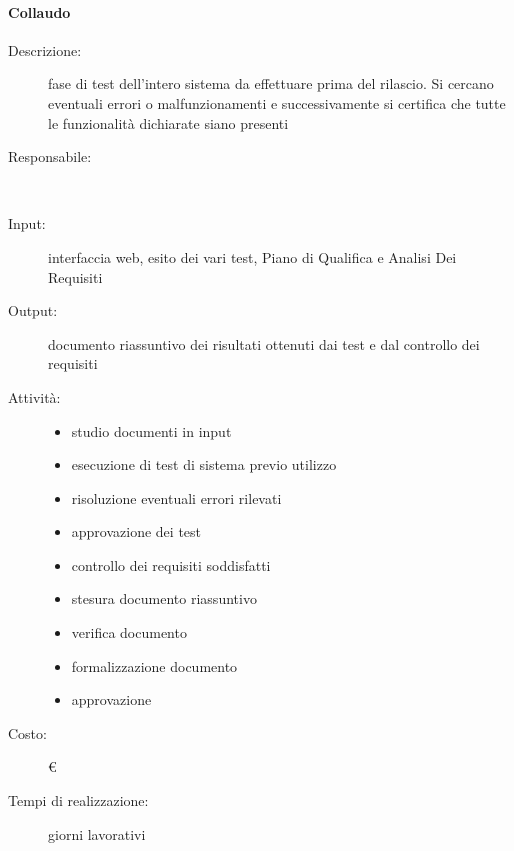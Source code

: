 \paragraph{Collaudo}
\begin{description}
\item[Descrizione:] fase di test dell’intero sistema da effettuare prima del rilascio. Si cercano
eventuali errori o malfunzionamenti e successivamente si certifica che tutte le funzionalità dichiarate siano presenti \\

\item[Responsabile:] \\

\item[Input:] interfaccia web, esito dei vari test, Piano di Qualifica e Analisi Dei Requisiti \\

\item[Output:] documento riassuntivo dei risultati ottenuti dai test e dal controllo dei requisiti \\

\item[Attività:]
\begin{itemize}
\item studio documenti in input
\item esecuzione di test di sistema previo utilizzo
\item risoluzione eventuali errori rilevati
\item approvazione dei test
\item controllo dei requisiti soddisfatti
\item stesura documento riassuntivo
\item verifica documento
\item formalizzazione documento
\item approvazione
\end{itemize}
\item[Costo:] \euro \\
\item[Tempi di realizzazione:]  giorni lavorativi
\end{description}



